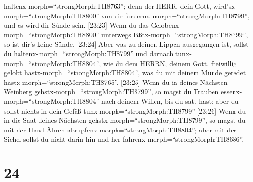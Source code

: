 haltenx-morph=``strongMorph:TH8763''; denn der HERR, dein Gott,
wird'sx-morph=``strongMorph:TH8800'' von dir
fordernx-morph=``strongMorph:TH8799'', und es wird dir Sünde sein.
 {[}23:23{]} Wenn du das
Gelobenx-morph=``strongMorph:TH8800'' unterwegs
läßtx-morph=``strongMorph:TH8799'', so ist dir's keine Sünde.
 {[}23:24{]} Aber was zu deinen Lippen ausgegangen ist,
sollst du haltenx-morph=``strongMorph:TH8799'' und darnach
tunx-morph=``strongMorph:TH8804'', wie du dem HERRN, deinem Gott,
freiwillig gelobt hastx-morph=``strongMorph:TH8804'', was du mit deinem
Munde geredet hastx-morph=``strongMorph:TH8765''. 
{[}23:25{]} Wenn du in deines Nächsten Weinberg
gehstx-morph=``strongMorph:TH8799'', so magst du Trauben
essenx-morph=``strongMorph:TH8804'' nach deinem Willen, bis du satt
hast; aber du sollst nichts in dein Gefäß
tunx-morph=``strongMorph:TH8799''  {[}23:26{]} Wenn du in
die Saat deines Nächsten gehstx-morph=``strongMorph:TH8799'', so magst
du mit der Hand Ähren abrupfenx-morph=``strongMorph:TH8804''; aber mit
der Sichel sollst du nicht darin hin und her
fahrenx-morph=``strongMorph:TH8686''.

\hypertarget{section-23}{%
\section{24}\label{section-23}}

